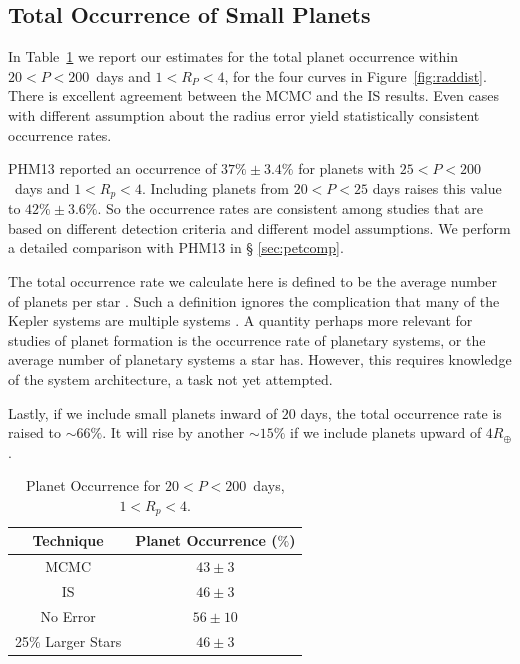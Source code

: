 \subsection{Total Occurrence of Small Planets}
\label{sec:totaloccur}
In Table~\ref{tab:occ} we report our estimates for the total planet
occurrence within $20 < P < 200$~days and $1 < R_P < 4$\rearth{}, for
the four curves in Figure~\ref{fig:raddist}. There is excellent
agreement between the MCMC and the IS results. Even cases with
different assumption about the radius error yield statistically
consistent occurrence rates.

PHM13 reported an occurrence of $37\% \pm 3.4\%$ for planets with 
$25<P<200$~days and $1<R_p<4$\rearth{}. Including planets from 
$20 < P < 25$ days raises this value to $42\% \pm 3.6\%$.  
So the occurrence rates are consistent among
studies that are based on different detection criteria and different
model assumptions.  We perform a detailed comparison with PHM13 in \S
\ref{sec:petcomp}.

The total occurrence rate we calculate here is defined to be the
average number of planets per star
\citep{Youdin,Fressin2013,Petigura2013}. Such a definition ignores
the complication that many of the Kepler systems are multiple
systems \citep[e.g.][]{Lissauer2011}. A quantity perhaps more
relevant for studies of planet formation is the occurrence
rate of planetary systems, or the average number of planetary
systems a star has. However, this requires knowledge of the system
architecture, a task not yet attempted.  

Lastly, if we include small planets inward of $20$ days, the total
occurrence rate is raised to $\sim 66\%$. It will rise by another
$\sim 15\%$ if we include planets upward of $4 R_\oplus$.

\begin{table}[h]
\centering
\caption{Planet Occurrence for $20<P<200$~days, $1<R_p<4$\rearth{}.}
\begin{tabular}{c|c}\hline Technique & Planet Occurrence ($\%$)\\\hline
MCMC                   & $43 \pm 3$ \\
IS                     & $46 \pm 3$ \\
No Error               & $56 \pm 10$ \\
25$\%$ Larger Stars    & $46 \pm 3$ \\
\hline
\end{tabular}
\label{tab:occ}
\end{table}

